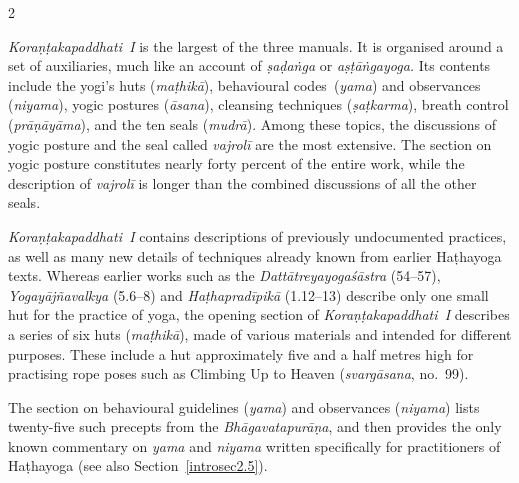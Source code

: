 \begin{nohyp}
\begin{multicols*}{2}
\begin{eng}
\label{koraux1e47ux1e6dakapaddhati-i}
\vskip 7pt

\noindent
\emph{Koraṇṭakapaddhati~I} is the largest of the three manuals. It is organised around a set of auxiliaries, much like an account of \emph{ṣaḍaṅga} or \emph{aṣṭāṅgayoga.} Its contents include the yogi's huts (\emph{maṭhikā}), behavioural codes~(\emph{yama}) and observances (\emph{niyama}), yogic postures (\emph{āsana}), cleansing techniques (\emph{ṣaṭkarma}), breath control (\emph{prāṇāyāma}), and the ten seals (\emph{mudrā}). Among these topics, the discussions of yogic posture and the seal called \emph{vajrolī} are the most extensive. The section on yogic posture constitutes nearly forty percent of the entire work, while the description of \emph{vajrolī} is longer than the combined discussions of all the other seals.

\emph{Koraṇṭakapaddhati~I} contains descriptions of previously undocumented practices, as well as many new details of techniques already known from earlier Haṭhayoga texts. Whereas earlier works such as the \emph{Dattātreyayogaśāstra} (54--57), \emph{Yogayājñavalkya} (5.6--8) and \emph{Haṭhapradīpikā} (1.12--13) describe only one small hut for the practice of yoga, the opening section of \emph{Koraṇṭakapaddhati~I} describes a series of six huts (\emph{maṭhikā}), made of various materials and intended for different purposes. These include a hut approximately five and a half metres high for practising rope poses such as Climbing Up to Heaven (\emph{svargāsana}, no.~99).

The section on behavioural guidelines (\emph{yama}) and observances (\emph{niyama}) lists twenty-five such precepts from the \emph{Bhāgavatapurāṇa}, and then provides the only known commentary on \emph{yama} and \emph{niyama} written specifically for practitioners of Haṭhayoga (see also Section~\ref{introsec2.5}).


\end{eng}
\end{multicols*}
\end{nohyp}
